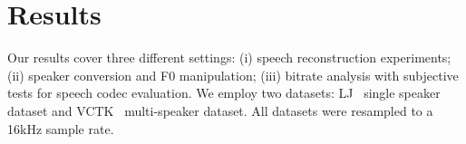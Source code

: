 \begin{table}[t!]
\centering
\caption{Voice conversion \& F0 manipulation results. MOS results are reported with 95\% confidence interval. VDE, and FFE are reported for F0 manipulation while PER, WER, EER, and MOS are reported for voice conversion. Notice, for VDE, and FFE higher is the better since F0 was flattened.}
\label{tab:conv}

\vspace{-0.4cm}
\end{table}

\vspace{-0.1cm}
\section{Results}
\vspace{-0.1cm}
Our results cover
three different settings: (i) speech reconstruction experiments; (ii) speaker conversion and F0 manipulation; (iii) bitrate analysis with subjective tests for speech codec evaluation. We employ two datasets: LJ~\cite{ljspeech17} single speaker dataset and VCTK~\cite{vctk} multi-speaker dataset. All datasets were resampled to a 16kHz sample rate.


